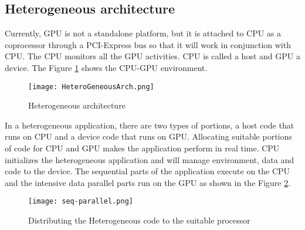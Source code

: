 \subsection{Heterogeneous architecture}
Currently, GPU is not a standalone platform, but it is attached to CPU as a coprocessor through a PCI-Express bus so that it will work in conjunction with CPU. The CPU monitors all the GPU activities. CPU is called a host and GPU a device. The Figure \ref{Figure:1.1} shows the CPU-GPU environment.
\begin{figure}[h!]
  \centering
  \texttt{[image: HeteroGeneousArch.png]}
  \caption{Heterogeneous architecture \cite{ProfessionalCUDA}}
  \label{Figure:1.1}
\end{figure}
In a heterogeneous application, there are two types of portions, a host code that runs on CPU and a device code that runs on GPU. Allocating suitable portions of code for CPU and GPU makes the application perform in real time. CPU initializes the heterogeneous application and will manage environment, data and code to the device. The sequential parts of the application execute on the CPU and the intensive data parallel parts run on the GPU as shown in the Figure \ref{Figure 1.2}. 
\begin{figure}[h!]
  \centering
  \texttt{[image: seq-parallel.png]}
  \caption{Distributing the Heterogeneous code to the suitable processor\cite{ProfessionalCUDA}}
  \label{Figure 1.2}
\end{figure}
